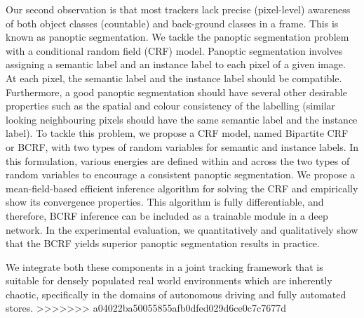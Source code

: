 Our second observation is that most trackers lack precise (pixel-level) awareness of both object classes (countable) and back-ground classes in a frame. This is known as panoptic segmentation. We tackle the panoptic segmentation problem with a conditional random field (CRF) model. Panoptic segmentation involves assigning a semantic label and an instance label to each pixel of a given image. At each pixel, the semantic label and the instance label should be compatible. Furthermore, a good panoptic segmentation should have several other desirable properties such as the spatial and colour consistency of the labelling (similar looking neighbouring pixels should have the same semantic label and the instance label). To tackle this problem, we propose a CRF model, named Bipartite CRF or BCRF, with two types of random variables for semantic and instance labels. In this formulation, various energies are defined within and across the two types of random variables to encourage a consistent panoptic segmentation. We propose a mean-field-based efficient inference algorithm for solving the CRF and empirically show its convergence properties. This algorithm is fully differentiable, and therefore, BCRF inference can be included as a trainable module in a deep network. In the experimental evaluation, we quantitatively and qualitatively show that the BCRF yields superior panoptic segmentation results in practice.

We integrate both these components in a joint tracking framework that is suitable for densely populated real world environments which are inherently chaotic, specifically in the domains of autonomous driving and fully automated stores.
>>>>>>> a04022ba50055855afb0dfed029d6ce0c7c7677d
